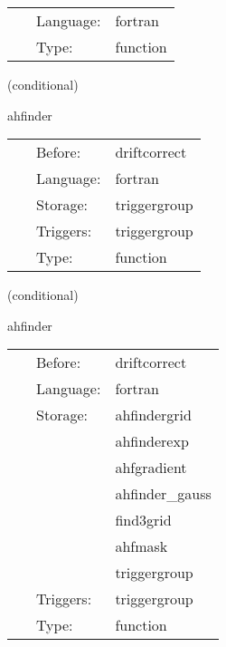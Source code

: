  \begin{tabular*}{160mm}{cll} 
~ & Language:  & fortran \\ 
~ & Type:  & function \\ 
\end{tabular*} 


\vspace{5mm}

   (conditional) 

\hspace{5mm} ahfinder 

\hspace{5mm}{\it call apparent horizon finder with persisting grid functions } 


\hspace{5mm}

 \begin{tabular*}{160mm}{cll} 
~ & Before:  & driftcorrect \\ 
~ & Language:  & fortran \\ 
~ & Storage:  & triggergroup \\ 
~ & Triggers:  & triggergroup \\ 
~ & Type:  & function \\ 
\end{tabular*} 


\vspace{5mm}

   (conditional) 

\hspace{5mm} ahfinder 

\hspace{5mm}{\it call apparent horizon finder } 


\hspace{5mm}

 \begin{tabular*}{160mm}{cll} 
~ & Before:  & driftcorrect \\ 
~ & Language:  & fortran \\ 
~ & Storage:  & ahfindergrid \\ 
~& ~ &ahfinderexp\\ 
~& ~ &ahfgradient\\ 
~& ~ &ahfinder\_gauss\\ 
~& ~ &find3grid\\ 
~& ~ &ahfmask\\ 
~& ~ &triggergroup\\ 
~ & Triggers:  & triggergroup \\ 
~ & Type:  & function \\ 
\end{tabular*} 


